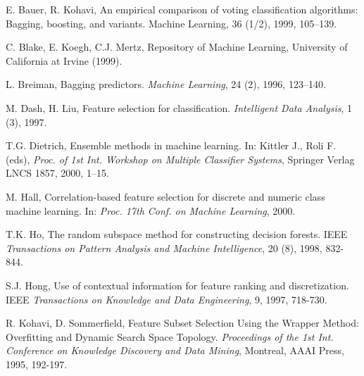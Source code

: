 \documentclass[runningheads]{llncs}
\begin{document}
\begin{thebibliography}{19}

 E. Bauer, R. Kohavi,  An empirical comparison of voting classification
algorithms: Bagging, boosting, and variants. Machine Learning, 36 (1/2),
1999, 105--139.


 C. Blake, E. Koegh, C.J. Mertz, Repository of Machine Learning,
University of California at Irvine (1999).

 L. Breiman,  Bagging predictors. \emph{Machine Learning},
24 (2), 1996, 123--140.

 M. Dash, H. Liu, Feature selection for classification.
\emph{Intelligent Data Analysis}, 1 (3), 1997.

 T.G. Dietrich, Ensemble methods in machine learning.
In: Kittler J., Roli F. (eds), \emph{Proc. of 1st Int. Workshop on Multiple
Classifier Systems}, Springer Verlag LNCS 1857, 2000, 1--15.



 M. Hall, Correlation-based feature selection for discrete
and numeric class machine learning. In: \emph{Proc. 17th Conf. on Machine
Learning}, 2000.



 T.K. Ho, The random subspace method for constructing decision
forests. IEEE \emph{Transactions on Pattern Analysis and Machine
Intelligence}, 20 (8), 1998, 832-844.

 S.J. Hong, Use of contextual information for feature
ranking and discretization. IEEE \emph{Transactions on Knowledge and Data
Engineering}, 9, 1997, 718-730.

%
%


 R. Kohavi, D. Sommerfield, Feature Subset Selection Using
the Wrapper Method: Overfitting and Dynamic Search Space Topology.
\emph{Proceedings of the 1st Int. Conference on Knowledge Discovery and Data
Mining}, Montreal, AAAI Press, 1995, 192-197.




\end{thebibliography}
\end{document}
